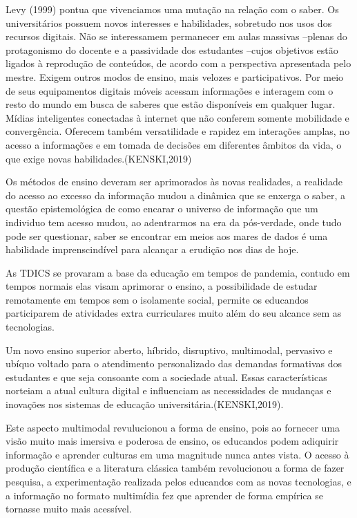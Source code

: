 \documentclass[article, 11pt, oneside, a4paper, english, brazil, sumario=tradicional]{abntex2}
\begin{document}
\begin{citacao}
Levy  (1999)  pontua  que  vivenciamos  uma  mutação  na  relação  com  o
saber.  Os universitários  possuem  novos  interesses  e  habilidades,
sobretudo  nos  usos  dos recursos digitais. Não se interessamem permanecer em
aulas massivas –plenas do protagonismo  do  docente  e  a  passividade  dos
estudantes –cujos  objetivos  estão ligados  à  reprodução  de  conteúdos,  de
acordo  com  a  perspectiva  apresentada  pelo mestre.  Exigem  outros  modos
de  ensino,  mais  velozes e  participativos.  Por  meio  de seus equipamentos
digitais móveis acessam informações e interagem com o resto do mundo  em  busca
de  saberes  que  estão  disponíveis  em  qualquer  lugar.  Mídias inteligentes
conectadas   à   internet   que   não   conferem   somente   mobilidade e
convergência.  Oferecem  também  versatilidade  e  rapidez  em  interações
amplas,  no acesso a informações e em tomada de decisões em diferentes âmbitos
da vida, o que exige novas habilidades.(KENSKI,2019)
\end{citacao}

    Os métodos de ensino deveram ser aprimorados às novas realidades, a realidade do acesso
ao excesso da informação mudou a dinâmica que se enxerga o saber, a questão epistemológica
de como encarar o universo de informação que um individuo tem acesso mudou, ao adentrarmos
na era da pós-verdade, onde tudo pode ser questionar, saber se encontrar em meios aos
mares de dados é uma habilidade imprenscindível para alcançar a erudição nos dias de hoje.

    As TDICS se provaram a base da educação em tempos de pandemia, contudo em tempos normais elas
visam aprimorar o ensino, a possibilidade de estudar remotamente em tempos sem o isolamente social, permite
os educandos participarem de atividades extra curriculares muito além do seu alcance sem as tecnologias.

\begin{citacao}
Um  novo  ensino  superior  aberto,  híbrido,  disruptivo,  multimodal,
pervasivo  e  ubíquo voltado para o atendimento personalizado das demandas
formativas dos estudantes e que  seja  consoante  com  a  sociedade  atual.
Essas  características  norteiam  a  atual cultura digital e influenciam as
necessidades de mudanças e inovações nos sistemas de educação
universitária.(KENSKI,2019).
\end{citacao}

    Este aspecto multimodal revulucionou a forma de ensino, pois ao fornecer
uma visão muito mais imersiva e poderosa de ensino, os educandos podem adiquirir
informação e aprender culturas em uma magnitude nunca antes vista. O acesso à
produção científica e a literatura clássica também revolucionou a forma de fazer pesquisa, a experimentação
realizada pelos educandos com as novas tecnologias, e a informação no formato multimídia fez que aprender
de forma empírica se tornasse muito mais acessível.
\end{document}
